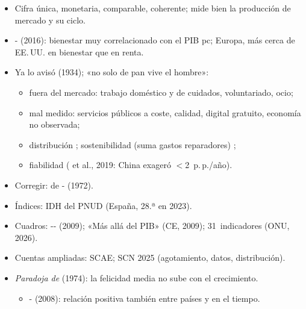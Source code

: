\documentclass{article}
\begin{document}
\begin{columnas}
\begin{itemize}
\item Cifra única, monetaria, comparable, coherente; mide bien la producción de mercado y su ciclo.
\item {}- (2016): bienestar muy correlacionado con el PIB pc; Europa, más cerca de EE.\,UU. en bienestar que en renta.
\end{itemize}
\begin{itemize}
\item Ya lo avisó  (1934); «no solo de pan vive el hombre»:
  \begin{itemize}
  \item fuera del mercado: trabajo doméstico y de cuidados, voluntariado, ocio;
  \item mal medido: servicios públicos a coste, calidad, digital gratuito, economía no observada;
  \item distribución ; sostenibilidad (suma gastos reparadores) ;
  \item fiabilidad ( et al., 2019: China exageró $<$2~p.\,p./año).
  \end{itemize}
\end{itemize}
\begin{itemize}
\item Corregir:  de - (1972).
\item Índices: IDH del PNUD (España, 28.ª en 2023).
\item Cuadros: -- (2009); «Más allá del PIB» (CE, 2009); 31~indicadores (ONU, 2026).
\item Cuentas ampliadas: SCAE; SCN 2025 (agotamiento, datos, distribución).
\item \emph{Paradoja de } (1974): la felicidad media no sube con el crecimiento.
  \begin{itemize}
  \item {}- (2008): relación positiva también entre países y en el tiempo.
  \end{itemize}
\end{itemize}


\end{columnas}
\end{document}
